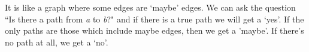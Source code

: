 It is like a graph where some edges are `maybe' edges.  We can ask the question ``Is there a path from \emph{a} to \emph{b}?" and if there is a true path we will get a `yes'. If the only paths are those which include maybe edges, then we get a 'maybe'. If there's no path at all, we get a `no'.

